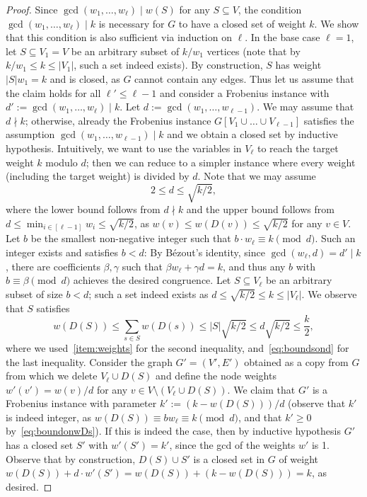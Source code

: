 \documentclass[10pt,a4paper]{article}
\newcommand{\divides}{\mid}
\newcommand{\notdivides}{\nmid}
\begin{document}
\begin{proof}
Since $\gcd(w_1,\dots, w_\ell) \divides w(S)$ for any $S\subseteq V$, the condition $\gcd(w_1,\dots,w_\ell) \divides k$ is necessary for $G$ to have a closed set of weight $k$.
%
We show that this condition is also sufficient via induction on $\ell$. In the base case $\ell=1$, let $S \subseteq V_1=V$ be an arbitrary subset of $k/w_1$ vertices (note that by $k/w_1 \le k \le |V_1|$, such a set indeed exists). By construction, $S$ has weight $|S|w_1 = k$ and is closed, as $G$ cannot contain any edges.
%
Thus let us assume that the claim holds for all $\ell' \le \ell - 1$ and consider a Frobenius instance with $d':=\gcd(w_1,\dots, w_\ell) \divides k$. Let $d := \gcd(w_1,\dots,w_{\ell-1})$. We may assume that $d \notdivides k$; otherwise, already the Frobenius instance $G[V_1 \cup \dots \cup V_{\ell-1}]$ satisfies the assumption $\gcd(w_1,\dots, w_{\ell-1})\divides k$ and we obtain a closed set by inductive hypothesis.
%
Intuitively, we want to use the variables in $V_\ell$ to reach the target weight $k$ modulo $d$; then we can reduce to a simpler instance where every weight (including the target weight) is divided by $d$.
Note that we may assume 
\begin{equation}\label{eq:boundsond}
 2 \le d \le \sqrt{k/2},
 \end{equation}
where the lower bound follows from $d\notdivides k$ and the upper bound follows from $d\le \min_{i\in [\ell-1]} w_i \le \sqrt{k/2}$, as $w(v) \le w(D(v)) \le \sqrt{k/2}$ for any $v\in V$.
%
Let $b$ be the smallest non-negative integer such that $b \cdot  w_\ell \equiv k \pmod d$. Such an integer exists and satisfies $b < d$: By B\'ezout's identity, since $\gcd(w_\ell, d) = d' \divides k$, there are coefficients $\beta, \gamma$ such that $\beta w_\ell + \gamma d = k$, and thus any $b$ with $b \equiv \beta \pmod d$ achieves the desired congruence. 
%
Let $S\subseteq V_\ell$ be an arbitrary subset of size $b< d$; such a set indeed exists as $d\le \sqrt{k/2} \le k \le |V_\ell|$. We observe that $S$ satisfies
\begin{equation}\label{eq:boundonwDs}
w(D(S)) \le \sum_{s \in S} w(D(s)) \le |S| \sqrt{k/2} \le d\sqrt{k/2} \le \frac{k}{2},
\end{equation}
where we used~\ref{item:weights} for the second inequality, and~\eqref{eq:boundsond} for the last inequality. 
Consider the graph $G' = (V', E')$ obtained as a copy from $G$ from which we delete $V_\ell \cup D(S)$ and define the node weights $w'(v') = w(v)/d$ for any $v\in V\setminus (V_\ell \cup D(S))$. We claim that $G'$ is a Frobenius instance with parameter $k' := (k-w(D(S)))/d$ (observe that $k'$ is indeed integer, as $w(D(S)) \equiv b w_\ell \equiv k \pmod d$, and that $k'\ge 0$ by~\eqref{eq:boundonwDs}). If this is indeed the case, then by inductive hypothesis $G'$ has a closed set $S'$ with $w'(S') = k'$, since the gcd of the weights $w'$ is 1. Observe that by construction, $D(S)\cup S'$ is a closed set in $G$ of weight $w(D(S)) + d \cdot w'(S') = w(D(S)) + (k-w(D(S))) = k$, as desired.

\end{proof}
\end{document}
